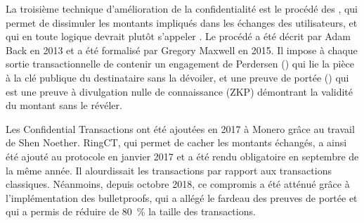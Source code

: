 

La troisième technique d'amélioration de la confidentialité est le procédé des , qui permet de dissimuler les montants impliqués dans les échanges des utilisateurs, et qui en toute logique devrait plutôt s'appeler . Le procédé a été décrit par Adam Back en 2013 et a été formalisé par Gregory Maxwell en 2015. Il impose à chaque sortie transactionnelle de contenir un engagement de Perdersen () qui lie la pièce à la clé publique du destinataire sans la dévoiler, et une preuve de portée () qui est une preuve à divulgation nulle de connaissance (ZKP) démontrant la validité du montant sans le révéler.

Les Confidential Transactions ont été ajoutées en 2017 à Monero grâce au travail de Shen Noether. RingCT, qui permet de cacher les montants échangés, a ainsi été ajouté au protocole en janvier 2017 et a été rendu obligatoire en septembre de la même année. Il alourdissait les transactions par rapport aux transactions classiques. Néanmoins, depuis octobre 2018, ce compromis a été atténué grâce à l'implémentation des bulletproofs, qui a allégé le fardeau des preuves de portée et qui a permis de réduire de 80~\% la taille des transactions.


